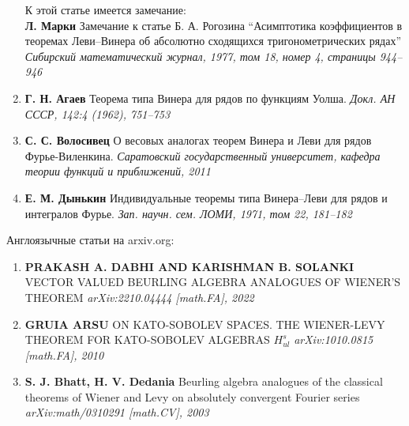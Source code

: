 \documentclass[12pt]{extarticle}
\theoremstyle{definition}
\begin{document}
\begin{enumerate}
		 К этой статье имеется замечание:\\ \textbf{Л. Марки} Замечание к статье Б. А. Рогозина “Асимптотика коэффициентов в теоремах Леви–Винера об абсолютно сходящихся тригонометрических рядах” \textit{Сибирский математический журнал, 1977, том 18, номер 4, страницы 944–946}
		 \item \textbf{Г. Н. Агаев} Теорема типа Винера для рядов по функциям Уолша. \textit{Докл. АН СССР, 142:4 (1962), 751–753}
		 \item \textbf{С. С. Волосивец} О весовых аналогах теорем Винера и Леви для рядов Фурье-Виленкина. \textit{Саратовский государственный университет, кафедра теории функций и приближений, 2011}
		 \item \textbf{Е. М. Дынькин} Индивидуальные теоремы типа Винера–Леви для рядов и интегралов Фурье. \textit{Зап. научн. сем. ЛОМИ, 1971, том 22, 181–182}
  	\end{enumerate}

  	Англоязычные статьи на arxiv.org:
  	\begin{enumerate}
		\item \textbf{PRAKASH A. DABHI AND KARISHMAN B. SOLANKI} VECTOR VALUED BEURLING ALGEBRA ANALOGUES OF
		WIENER’S THEOREM \textit{arXiv:2210.04444 [math.FA], 2022}
		\item \textbf{GRUIA ARSU} ON KATO-SOBOLEV SPACES. THE WIENER-LEVY THEOREM FOR KATO-SOBOLEV ALGEBRAS $H^s_{ul}$ \textit{arXiv:1010.0815 [math.FA], 2010}
		\item \textbf{S. J. Bhatt, H. V. Dedania} Beurling algebra analogues of the classical theorems of Wiener and Levy on absolutely convergent Fourier series \textit{	arXiv:math/0310291 [math.CV], 2003}
  	\end{enumerate}
\end{document}
